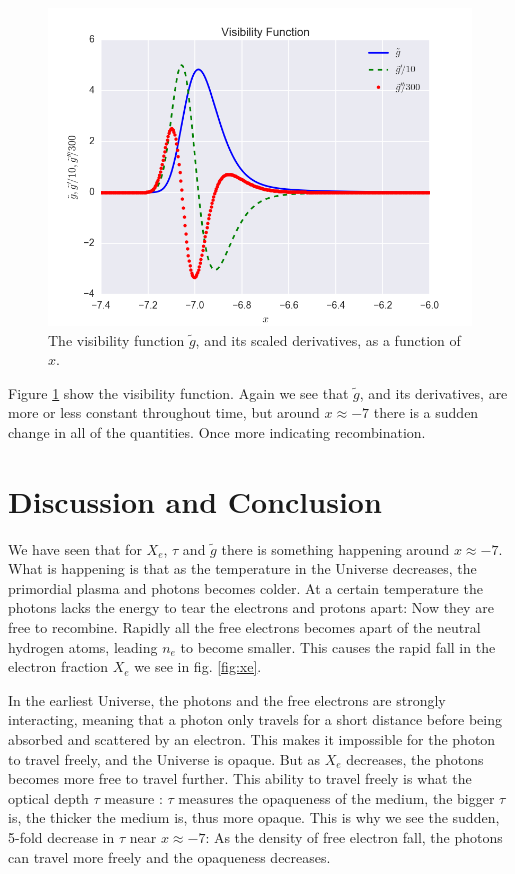 \documentclass[a4paper,norsk, 10pt]{article}
\begin{document}
\begin{figure}[!htb]
\centering
\includegraphics[scale=0.5]{g.png}
\caption{The visibility function $\tilde{g}$, and its scaled derivatives, as a function of $x$.}\label{fig:g}
\end{figure}

Figure \ref{fig:g} show the visibility function. Again we see that $\tilde{g}$, and its derivatives, are more or less constant throughout time, but around $x\approx -7$ there is a sudden change in all of the quantities. Once more indicating recombination.


\section{Discussion and Conclusion}
We have seen that for $X_e$, $\tau$ and $\tilde{g}$ there is something happening around $x\approx -7$. What is happening is that as the temperature in the Universe decreases, the primordial plasma and photons becomes colder. At a certain temperature the photons lacks the energy to tear the electrons and protons apart: Now they are free to recombine. Rapidly all the free electrons becomes apart of the neutral hydrogen atoms, leading $n_e$ to become smaller. This causes the rapid fall in the electron fraction $X_e$ we see in fig. \ref{fig:xe}.

In the earliest Universe, the photons and the free electrons are strongly interacting, meaning that a photon only travels for a short distance before being absorbed and scattered by an electron. This makes it impossible for the photon to travel freely, and the Universe is opaque. But as $X_e$ decreases, the photons becomes more free to travel further. This ability to travel freely is what the optical depth $\tau$ measure : $\tau$ measures the opaqueness of the medium, the bigger $\tau$ is, the thicker the medium is, thus more opaque. This is why we see the sudden, 5-fold decrease in $\tau$ near $x\approx -7$: As the density of free electron fall, the photons can travel more freely and the opaqueness decreases.
\end{document}
